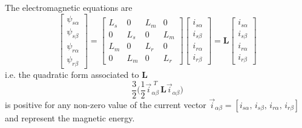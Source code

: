 \documentclass[11pt,a4paper,oneside]{book}
\numberwithin{equation}{section}
\theoremstyle{it}
\theoremstyle{definition}
\begin{document}
The electromagnetic equations are
\begin{equation}\label{im_eq_21}
	\left[\begin{matrix}
		\psi_{s\alpha} \\[6pt]
		\psi_{s\beta} \\[6pt]
		\psi_{r\alpha} \\[6pt]
		\psi_{r\beta}
	\end{matrix}\right] = 
	\left[\begin{matrix}
		L_s & 0 & L_m & 0 \\[6pt]
		0 & L_s & 0 & L_m \\[6pt]
		L_m & 0 & L_r & 0 \\[6pt]
		0 & L_m & 0 & L_r 
	\end{matrix}\right]
	\left[\begin{matrix}
		i_{s\alpha} \\[6pt]
		i_{s\beta} \\[6pt]
		i_{r\alpha} \\[6pt]
		i_{r\beta} 
	\end{matrix}\right] = \mathbf{L}
	\left[\begin{matrix}
		i_{s\alpha} \\[6pt]
		i_{s\beta} \\[6pt]
		i_{r\alpha} \\[6pt]
		i_{r\beta} 
	\end{matrix}\right]
\end{equation}
i.e. the quadratic form associated to $\mathbf{L}$
\begin{equation}\label{im_eq_22}
	\frac{3}{2}\Bigg(\frac{1}{2}\vec{i}_{\alpha\beta}^{\,\,T} 
	\,\mathbf{L}\vec{i}_{\alpha\beta}\Bigg)
\end{equation}
is positive for any non-zero value of the current vector 
$\vec{i}_{\alpha\beta}=[i_{s\alpha},\,i_{s\beta},\,i_{r\alpha},\,i_{r\beta}]$ 
and represent the magnetic energy.
\end{document}
